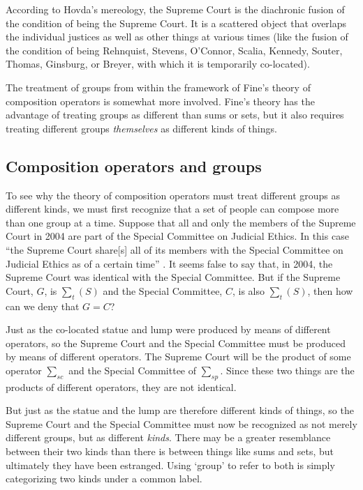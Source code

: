 \documentclass[11pt]{article}
\begin{document}
\begin{spacing}{1.5}
According to Hovda's mereology, the Supreme Court is the diachronic
fusion of the condition of being the Supreme Court.  It is a scattered
object that overlaps the individual justices as well as other things
at various times (like the fusion of the condition of being Rehnquist,
Stevens, O'Connor, Scalia, Kennedy, Souter, Thomas, Ginsburg, or
Breyer, with which it is temporarily co-located).

The treatment of groups from within the framework of Fine's theory of
composition operators is somewhat more involved.  Fine's theory has
the advantage of treating groups as different than sums or sets, but
it also requires treating different groups {\em themselves} as
different kinds of things.

\subsection{Composition operators and groups}
\label{group-fine}
To see why the theory of composition operators must treat different
groups as different kinds, we must first recognize that a set of
people can compose more than one group at a time.  Suppose that all
and only the members of the Supreme Court in 2004 are part of the
Special Committee on Judicial Ethics.  In this case ``the Supreme
Court share[s] all of its members with the Special Committee on
Judicial Ethics as of a certain time'' \citep[151]{uzquiano2004a}.  It
seems false to say that, in 2004, the Supreme Court was identical with
the Special Committee.  But if the Supreme Court, $G$, is $\sum _{t} (
S )$ and the Special Committee, $C$, is also $\sum _{t} ( S )$, then
how can we deny that $G = C$?

Just as the co-located statue and lump were produced by means of
different operators, so the Supreme Court and the Special Committee
must be produced by means of different operators.  The Supreme Court
will be the product of some operator $\sum _{sc}$ and the Special
Committee of $\sum _{sp}$.  Since these two things are the products of
different operators, they are not identical.

But just as the statue and the lump are therefore different kinds of
things, so the Supreme Court and the Special Committee must now be
recognized as not merely different groups, but as different {\em
  kinds}.  There may be a greater resemblance between their two kinds
than there is between things like sums and sets, but ultimately they
have been estranged.  Using `group' to refer to both is simply
categorizing two kinds under a common label.


\end{spacing}
\end{document}

